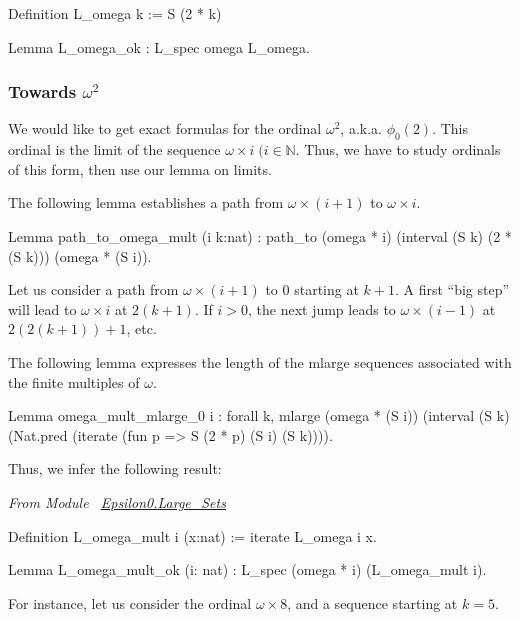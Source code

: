 \begin{Coqsrc}
Definition L_omega k := S (2 * k)%

Lemma L_omega_ok : L_spec omega L_omega.
\end{Coqsrc}

\subsubsection{Towards  \texorpdfstring{$\omega^2$}{omega*omega}}

We would like to get exact formulas for the ordinal $\omega^2$, a.k.a.
$\phi_0(2)$. This ordinal is the limit of the sequence $\omega\times i\;(i \in \mathbb{N}$. Thus, we have to study ordinals of this form, then use 
our lemma on limits.

The following lemma establishes a path from $\omega\times ( i+1)$ to
$\omega \times i$.

\begin{Coqsrc}
Lemma path_to_omega_mult (i k:nat) :
  path_to (omega * i) (interval (S k) (2 * (S k))) (omega * (S i)).
\end{Coqsrc}

Let us consider a path from  $\omega\times(i+1)$ to $0$ starting at $k+1$.
A first ``big step'' will lead to $\omega\times i$ at $2(k+1)$. If $i>0$, the
next jump leads to $\omega\times(i-1)$ at $2(2(k+1))+1$, etc.


The following lemma expresses the length of the mlarge sequences associated with the finite multiples of $\omega$.


\begin{Coqsrc}
Lemma omega_mult_mlarge_0 i  : forall k,
    mlarge  (omega * (S i))
            (interval (S k)
                      (Nat.pred (iterate (fun p =>  S (2 * p)%
                                         (S i)
                                         (S k)))).
\end{Coqsrc}

Thus, we infer the following result:

\emph{From Module~ \href{../theories/html/hydras.Epsilon0.Large_Sets.html\#L_omega_mult}{Epsilon0.Large\_Sets}}

\begin{Coqsrc}
Definition L_omega_mult i (x:nat) :=  iterate L_omega i x.

Lemma L_omega_mult_ok (i: nat) :  L_spec (omega * i) (L_omega_mult i).
\end{Coqsrc}

For instance, let us consider the ordinal $\omega\times 8$, and a sequence 
starting at $k=5$.

